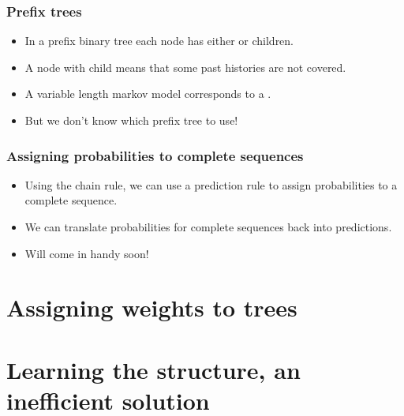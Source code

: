 \documentclass[handout]{beamer}
\begin{document}
\begin{frame}
\frametitle{Prefix trees}
\begin{itemize}
\item In a prefix binary tree each node has either  or  children.
\item A node with  child means that some past histories are not covered.
\item A variable length markov model corresponds to a .
\item But we don't know which prefix tree to use!
\end{itemize}
\end{frame}

\begin{frame}
\frametitle{Assigning probabilities to complete sequences}
\begin{itemize}
\item Using the chain rule, we can use a prediction rule to 
assign probabilities to a complete sequence.
\R{\[
P \paren{x_1=y_1,\ldots,x_T=y_T} = p \paren{x_1=y_1} p\paren{x_2=y_2|x_1=y_1} \ldots
\]}
\item
We can translate probabilities for complete sequences back into predictions.
\item
Will come in handy soon!
\end{itemize}
\end{frame}

\section{Assigning weights to trees}

\section{Learning the structure, an inefficient solution}
\end{document}
